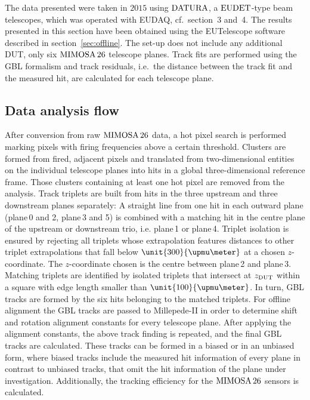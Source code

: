 
The data presented were taken in $2015$ using $\textrm{DATURA}$, a $\textrm{EUDET}$-type beam telescopes, which was operated with EUDAQ, cf.~section~3 and~4. 
The results presented in this section have been obtained using the EUTelescope software described in section~\ref{sec:offline}.
The set-up does not include any additional DUT, only six $\textrm{MIMOSA\,26}$ telescope planes. 
Track fits are performed using the GBL formalism and track residuals, i.e.\ the distance between the track fit and the measured hit,
 are calculated for each telescope plane. 
 

\subsection{Data analysis flow}
\label{sec:datura-nodut}

After conversion from raw $\textrm{MIMOSA\,26}$ data, a hot pixel search is performed marking pixels with firing frequencies above a certain threshold.
Clusters are formed from fired, adjacent pixels and translated from two-dimensional entities on the individual telescope planes into hits in a global three-dimensional reference frame.
Those clusters containing at least one hot pixel are removed from the analysis. 
Track triplets are built from hits in the three upstream and three downstream planes separately: 
A straight line from one hit in each outward plane (plane\,0 and 2, plane\,3 and 5) is combined with a matching hit in the centre plane of the upstream or downstream trio, i.e. plane\,1 or plane\,4. 
Triplet isolation is ensured by rejecting all triplets whose extrapolation features distances to other triplet extrapolations that fall below $\unit{300}{\upmu\meter}$ at a chosen $z$-coordinate.
The $z$-coordinate chosen is the centre between plane\,2 and plane\,3. 
Matching triplets are identified by isolated triplets that intersect at $z_{\textrm{DUT}}$ within a square with edge length smaller than $\unit{100}{\upmu\meter}$. 
In turn, GBL tracks are formed by the six hits belonging to the matched triplets. 
For offline alignment the GBL tracks are passed to Millepede-II in order to determine shift and rotation alignment constants for every telescope plane.
After applying the alignment constants, the above track finding is repeated, and the final GBL tracks are calculated. 
These tracks can be formed in a \textrm{biased} or in an \textrm{unbiased} form, where biased tracks include the measured hit information of every plane in contrast to unbiased tracks,
 that omit the hit information of the plane under investigation. 
Additionally, the tracking efficiency for the $\textrm{MIMOSA\,26}$ sensors is calculated. 

